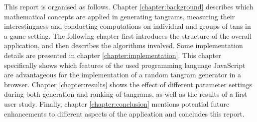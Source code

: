 This report is organised as follows. Chapter \ref{chapter:background} describes which mathematical concepts are applied in generating tangrams, measuring their interestingness and conducting computations on individual and groups of tans in a game setting. The following chapter first introduces the structure of the overall application, and then describes the algorithms involved. Some implementation details are presented in chapter \ref{chapter:implementation}. This chapter specifically shows which features of the used programming language JavaScript are advantageous for the implementation of a random tangram generator in a browser. Chapter \ref{chapter:results} shows the effect of different parameter settings during both generation and ranking of tangrams, as well as the results of a first user study. Finally, chapter \ref{chapter:conclusion} mentions potential future enhancements to different aspects of the application and concludes this report.
